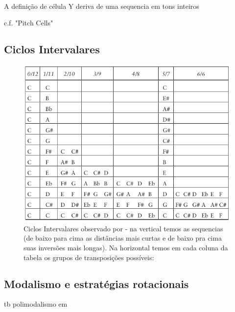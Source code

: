\documentclass[
	12pt,				%
	openright,			%
	twoside,			%
	a4paper,			%
	english,			%
	french,				%
	spanish,			%
	brazil				%
	]{abntex2}
\begin{document}
A definição de célula Y deriva de uma sequencia em tons inteiros


c.f. "Pitch Cells"
\cite[p.130]{susanni_antokoletz2012music}


\subsection{Ciclos Intervalares}


\begin{figure}[!h]
	\caption{\label{fig_grafico}Ciclos Intervalares observado por  - na vertical temos as sequencias (de baixo para cima as distâncias mais curtas e de baixo pra cima suas inversões mais longas). Na horizontal temos em cada coluna da tabela os grupos de transposições possíveis: }
	\begin{center}
	    \includegraphics[scale=0.6]{antokoletz/ciclos_intervalares_table2012.png}
	\end{center}
\end{figure}



\subsection{Modalismo e estratégias rotacionais}

\cite{susanni_antokoletz2012music}


tb  polimodalismo em
\cite{suchoff2004bartok}
\end{document}
